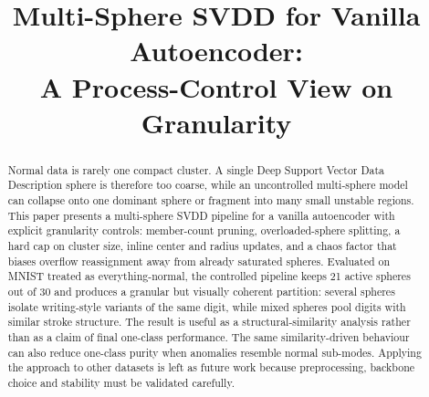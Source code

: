 \documentclass[conference]{IEEEtran}
\begin{document}
\title{Multi-Sphere SVDD for Vanilla Autoencoder:\\A Process-Control View on Granularity}
\author{
\and 
{}
\and
{}
}

\maketitle

\begin{abstract}
Normal data is rarely one compact cluster. A single Deep Support Vector Data Description sphere is therefore too coarse, while an uncontrolled multi-sphere model can collapse onto one dominant sphere or fragment into many small unstable regions. This paper presents a multi-sphere SVDD pipeline for a vanilla autoencoder with explicit granularity controls: member-count pruning, overloaded-sphere splitting, a hard cap on cluster size, inline center and radius updates, and a chaos factor that biases overflow reassignment away from already saturated spheres. Evaluated on MNIST \cite{lecun1998gradient} treated as everything-normal, the controlled pipeline keeps 21 active spheres out of 30 and produces a granular but visually coherent partition: several spheres isolate writing-style variants of the same digit, while mixed spheres pool digits with similar stroke structure. The result is useful as a structural-similarity analysis rather than as a claim of final one-class performance. The same similarity-driven behaviour can also reduce one-class purity when anomalies resemble normal sub-modes. Applying the approach to other datasets is left as future work because preprocessing, backbone choice and stability must be validated carefully.
\end{abstract}
\end{document}
